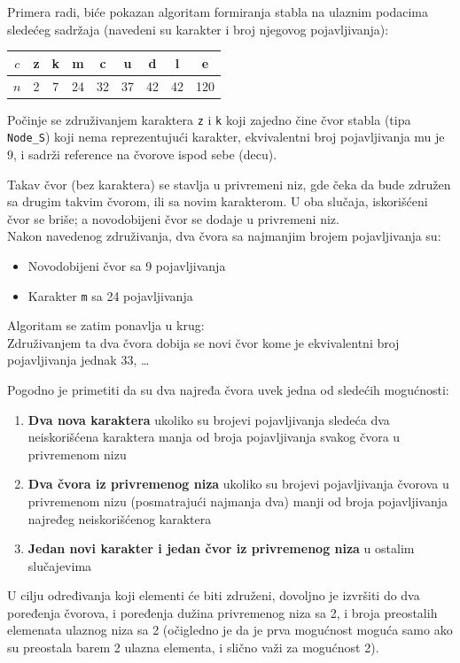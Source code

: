 \documentclass[a4paper, 12pt]{article}
\begin{document}
Primera radi, biće pokazan algoritam formiranja stabla na ulaznim podacima sledećeg sadržaja (navedeni su karakter i broj njegovog pojavljivanja):
\begin{table}[ht]
	\centering
	\begin{tabular}{| c ||  c  c  c  c  c  c  c  c |}
		\hline
		$c$ & z & k & m & c & u & d & l & e \\ \hline
		$n$ & 2 & 7 & 24 & 32 & 37 & 42 & 42 & 120 \\ \hline
	\end{tabular}
\end{table}

Počinje se združivanjem karaktera \verb|z| i \verb|k| koji zajedno čine čvor stabla (tipa \verb|Node_S|) koji nema reprezentujući karakter, ekvivalentni broj pojavljivanja mu je $9$, i sadrži reference na čvorove ispod sebe (decu). 

Takav čvor (bez karaktera) se stavlja u privremeni niz, gde čeka da bude združen sa drugim takvim čvorom, ili sa novim karakterom. U oba slučaja, iskorišćeni čvor se briše; a novodobijeni čvor se dodaje u privremeni niz. \\
Nakon navedenog združivanja, dva čvora sa najmanjim brojem pojavljivanja su:
\begin{itemize}
	\item Novodobijeni čvor sa 9 pojavljivanja
	\item Karakter \verb|m| sa 24 pojavljivanja
\end{itemize}
Algoritam se zatim ponavlja u krug: \\
Združivanjem ta dva čvora dobija se novi čvor kome je ekvivalentni broj pojavljivanja jednak $33$, \ldots

Pogodno je primetiti da su dva najređa čvora uvek jedna od sledećih mogućnosti:
\begin{enumerate}
	\item \textbf{Dva nova karaktera} ukoliko su brojevi pojavljivanja sledeća dva neiskorišćena karaktera manja od broja pojavljivanja svakog čvora u privremenom nizu
	\item \textbf{Dva čvora iz privremenog niza} ukoliko su brojevi pojavljivanja čvorova u privremenom nizu (posmatrajući najmanja dva) manji od broja pojavljivanja najređeg neiskorišćenog karaktera
	\item \textbf{Jedan novi karakter i jedan čvor iz privremenog niza} u ostalim slučajevima
\end{enumerate}

U cilju određivanja koji elementi će biti združeni, dovoljno je izvršiti do dva poređenja čvorova, i poređenja dužina privremenog niza sa 2, i broja preostalih elemenata ulaznog niza sa 2 (očigledno je da je prva mogućnost moguća samo ako su preostala barem 2 ulazna elementa, i slično važi za mogućnost 2).
\end{document}

